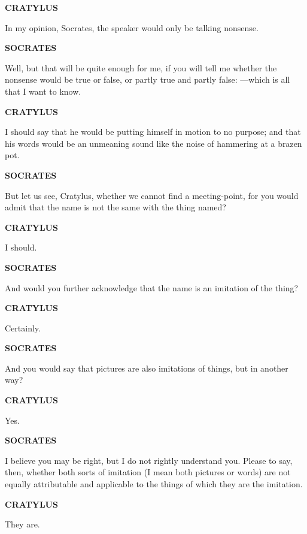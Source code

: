 \documentclass[11pt,letter]{article}
\begin{document}
\par \textbf{CRATYLUS}
\par   In my opinion, Socrates, the speaker would only be talking nonsense.

\par \textbf{SOCRATES}
\par   Well, but that will be quite enough for me, if you will tell me whether the nonsense would be true or false, or partly true and partly false: —which is all that I want to know.

\par \textbf{CRATYLUS}
\par   I should say that he would be putting himself in motion to no purpose; and that his words would be an unmeaning sound like the noise of hammering at a brazen pot.

\par \textbf{SOCRATES}
\par   But let us see, Cratylus, whether we cannot find a meeting-point, for you would admit that the name is not the same with the thing named?

\par \textbf{CRATYLUS}
\par   I should.

\par \textbf{SOCRATES}
\par   And would you further acknowledge that the name is an imitation of the thing?

\par \textbf{CRATYLUS}
\par   Certainly.

\par \textbf{SOCRATES}
\par   And you would say that pictures are also imitations of things, but in another way?

\par \textbf{CRATYLUS}
\par   Yes.

\par \textbf{SOCRATES}
\par   I believe you may be right, but I do not rightly understand you. Please to say, then, whether both sorts of imitation (I mean both pictures or words) are not equally attributable and applicable to the things of which they are the imitation.

\par \textbf{CRATYLUS}
\par   They are.
\end{document}
